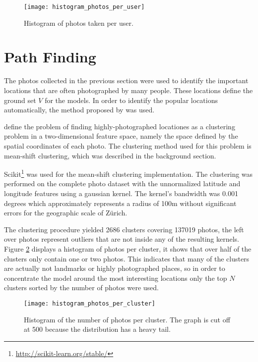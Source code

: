 \begin{figure}
  \centering
  \texttt{[image: histogram\_photos\_per\_user]}
  \caption{Histogram of photos taken per user.}
  \label{fig:photo_user_distribution}
\end{figure}

\section{Path Finding}
\label{sec:path_discovery}

The photos collected in the previous section were used to identify the important locations that are often photographed by many people. These locations define the ground set $V$ for the models. In order to identify the popular locations automatically, the method proposed by \citet{Kleinberg2009} was used.

\citet{Kleinberg2009} define the problem of finding highly-photographed locationes as a clustering problem in a two-dimensional feature space, namely the space defined by the spatial coordinates of each photo. The clustering method used for this problem is mean-shift clustering, which was described in the background section.

Scikit\footnote{\url{http://scikit-learn.org/stable/}} was used for the mean-shift clustering implementation. The clustering was performed on the complete photo dataset with the unnormalized latitude and longitude features using a gaussian kernel. The kernel's bandwidth was 0.001 degrees which approximately represents a radius of 100m without significant errors for the geographic scale of Zürich.

The clustering procedure yielded 2686 clusters covering 137019 photos, the left over photos represent outliers that are not inside any of the resulting kernels. Figure \ref{fig:photos_per_clusters} displays a histogram of photos per cluster, it shows that over half of the clusters only contain one or two photos. This indicates that many of the clusters are actually not landmarks or highly photographed places, so in order to concentrate the model around the most interesting locations only the top $N$ clusters sorted by the number of photos were used.

\begin{figure}
  \centering
  \texttt{[image: histogram\_photos\_per\_cluster]}
  \caption{Histogram of the number of photos per cluster. The graph is cut off at 500 because the distribution has a heavy tail.}
  \label{fig:photos_per_clusters}
\end{figure}

